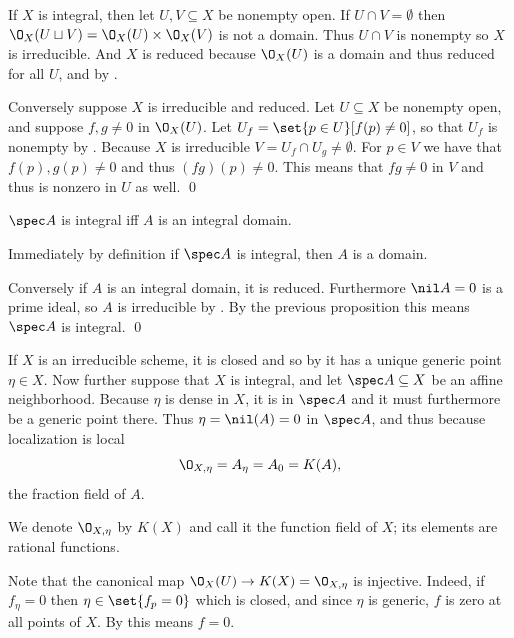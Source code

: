     If $X$ is integral, then let $U,V\subseteq X$ be nonempty open.
    If $U\cap V=\emptyset$ then $\O_X(U\sqcup V)=\O_X(U)\times\O_X(V)$ is not a domain.
    Thus $U\cap V$ is nonempty so $X$ is irreducible.
    And $X$ is reduced because $\O_X(U)$ is a domain and thus reduced for all $U$, and by .

    Conversely suppose $X$ is irreducible and reduced.
    Let $U\subseteq X$ be nonempty open, and suppose $f,g\neq0$ in $\O_X(U)$.
    Let $U_f=\set{p\in U}[f(p)\neq0]$, so that $U_f$ is nonempty by .
    Because $X$ is irreducible $V=U_f\cap U_g\neq\emptyset$.
    For $p\in V$ we have that $f(p),g(p)\neq0$ and thus $(fg)(p)\neq0$.
    This means that $fg\neq0$ in $V$ and thus is nonzero in $U$ as well.
    \qed

\eproof

\bprop

    $\spec A$ is integral iff $A$ is an integral domain.

\eprop

\bproof

    Immediately by definition if $\spec A$ is integral, then $A$ is a domain.

    Conversely if $A$ is an integral domain, it is reduced.
    Furthermore $\nil A=0$ is a prime ideal, so $A$ is irreducible by .
    By the previous proposition this means $\spec A$ is integral.
    \qed

\eproof

If $X$ is an irreducible scheme, it is closed and so by  it has a unique generic point $\eta\in X$.
Now further suppose that $X$ is integral, and let $\spec A\subseteq X$ be an affine neighborhood.
Because $\eta$ is dense in $X$, it is in $\spec A$ and it must furthermore be a generic point there.
Thus $\eta=\nil(A)=0$ in $\spec A$, and thus because localization is local
$$ \O_{X,\eta} = A_\eta = A_0 = K(A) , $$
the fraction field of $A$.

We denote $\O_{X,\eta}$ by $K(X)$ and call it the {\emphcolor function field} of $X$; its elements are {\emphcolor rational functions}.

Note that the canonical map $\O_X(U)\to K(X)=\O_{X,\eta}$ is injective.
Indeed, if $f_\eta=0$ then $\eta\in\set{f_p=0}$ which is closed, and since $\eta$ is generic, $f$ is zero at all points of $X$.
By  this means $f=0$.

